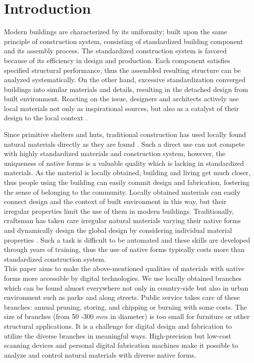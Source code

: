 \section{Introduction}
Modern buildings are characterized by its uniformity; built upon the same principle of construction system, consisting of standardized building component and its assembly process.
The standardized construction system is favored because of its efficiency in design and production.
Each component satisfies specified structural performance, thus the assembled resulting structure can be analyzed systematically.
On the other hand, excessive standardization converged buildings into similar materials and details, resulting in the detached design from built environment.
Reacting on the issue, designers and architects actively use local materials not only as inspirational sources, but also as a catalyst of their design to the local context \cite{oliver1997encyclopedia}.

Since primitive shelters and huts, traditional construction has used locally found natural materials directly as they are found \cite{weston2003materials}.
Such a direct use can not compete with highly standardized materials and construction system, however, the uniqueness of native forms is a valuable quality which is lacking in standardized materials.
As the material is locally obtained, building and living get much closer, thus people using the building can easily commit design and fabrication, fostering the sense of belonging to the community.
Locally obtained materials can easily connect design and the context of built environment in this way, but their irregular properties limit the use of them in modern buildings.
Traditionally, craftsman has taken care irregular natural materials varying their native forms and dynamically design the global design by considering individual material properties \cite{pye1968nature}.
Such a task is difficult to be automated and these skills are developed through years of training, thus the use of native forms typically costs more than standardized construction system. \\

This paper aims to make the above-mentioned qualities of materials with native forms more accessible by digital technologies.
We use locally obtained branches which can be found almost everywhere not only in country-side but also in urban environment such as parks and along streets.
Public service takes care of these branches: annual pruning, storing, and chipping or burning with some costs.
The size of branches (from 50 -300 $mm$ in diameter) is too small for furniture or other structural applications.
It is a challenge for digital design and fabrication to utilize the diverse branches in meaningful ways.
High-precision but low-cost scanning devices and personal digital fabrication machines make it possible to analyze and control natural materials with diverse native forms.

